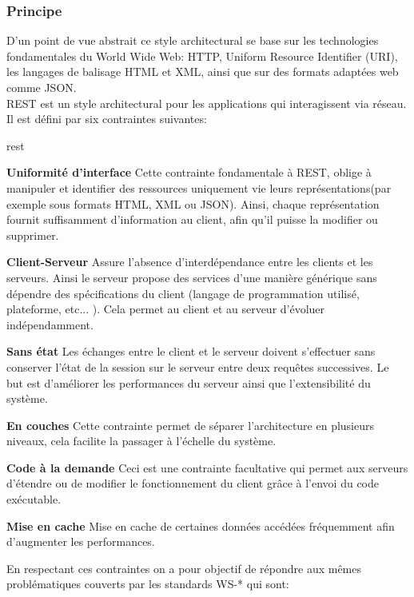 \subsubsection{Principe}
D'un point de vue abstrait ce style architectural se base sur les technologies fondamentales du World Wide Web: HTTP, Uniform Resource Identifier (URI),  les langages de balisage HTML et XML, ainsi que sur des formats adaptées web comme JSON.\\
REST est un style architectural pour les applications qui interagissent via réseau. Il est défini par six contraintes suivantes: 
\begin{labeling}{rest}
	
\item [\textbf{Uniformité d'interface}] Cette contrainte fondamentale à REST, oblige à manipuler et identifier des ressources uniquement vie leurs représentations(par exemple sous formats HTML, XML ou JSON). Ainsi, chaque représentation fournit suffisamment d'information au client, afin qu'il puisse la modifier ou supprimer.

\item [\textbf{Client-Serveur}] Assure l'absence d'interdépendance entre les clients et les serveurs. Ainsi le serveur propose des services d'une manière générique sans dépendre des spécifications du client (langage de programmation utilisé, plateforme, etc... ). Cela permet au client et au serveur d'évoluer indépendamment. 


\item [\textbf{Sans état}] Les échanges entre le client et le serveur doivent s'effectuer sans conserver l'état de la session sur le serveur entre deux requêtes successives. Le but est d'améliorer les performances du serveur ainsi que l'extensibilité du système. 

\item [\textbf{En couches}] Cette contrainte permet de séparer l'architecture en plusieurs niveaux, cela facilite la passager à l'échelle du système. 
\item [\textbf{Code à la demande}] Ceci est une contrainte facultative qui permet aux serveurs d'étendre ou de modifier le fonctionnement du client grâce à l'envoi du code exécutable.
\item [\textbf{Mise en cache}] Mise en cache de certaines données accédées fréquemment afin d'augmenter les performances. \cite{restcook}

\end{labeling}
 En respectant ces contraintes on a pour objectif de répondre aux mêmes problématiques couverts par les standards WS-* qui sont:
